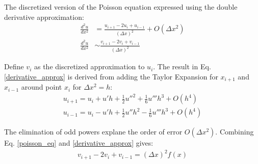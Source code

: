 The discretized version of the Poisson equation expressed using the double derivative approximation:
\begin{align}
    \frac{d^2u}{dx^2}  &= \frac{u_{i+1} - 2u_{i} + u_{i-1}}{(\Delta x)^2} + O(\Delta x^2)  \\
    \frac{d^2u}{dx^2} &\sim \frac{v_{i+1} - 2v_{i} + v_{i-1}}{(\Delta x)^2}
    \label{derivative_approx}
\end{align}

Define $v_i$ as the discretized approximation to $u_i$. The result in Eq. \ref{derivative_approx} is derived from adding the Taylor Expansion for $x_{i+1} $ and $x_{i-1}$ around point $x_i$ for $\Delta x^2 = h$: 
\begin{align*}
    u_{i+1} = u_i + u'h + \frac{1}{2}u''^2 + \frac{1}{6}u'''h^3 + O(h^4)\\
    u_{i-1} = u_i - u'h + \frac{1}{2}u''h^2 - \frac{1}{6}u'''h^3 + O(h^4) 
\end{align*}

The elimination of odd powers explane the order of error $O(\Delta x^2)$. Combining Eq. \ref{poisson_eq} and \ref{derivative_approx} gives:
\begin{align}
    v_{i+1} - 2v_{i} + v_{i-1} = (\Delta x)^2 f(x)
\end{align}


